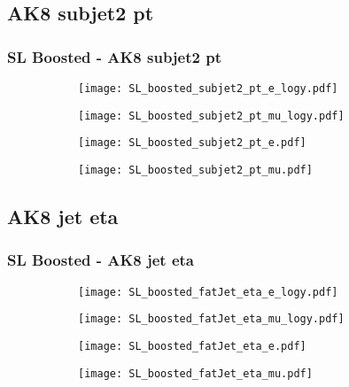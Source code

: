 \documentclass[aspectratio=169,8pt]{beamer}
\begin{document}
\subsection{AK8 subjet2 pt}
\begin{frame}
\frametitle{SL Boosted - AK8 subjet2 pt}
\begin{figure}
\captionsetup[subfigure]{labelformat=empty}
\begin{subfigure}{0.375\textwidth}
\texttt{[image: SL\_boosted\_subjet2\_pt\_e\_logy.pdf]}
\vspace*{-0.15cm}
\end{subfigure}
\hfil
\begin{subfigure}{0.375\textwidth}
\texttt{[image: SL\_boosted\_subjet2\_pt\_mu\_logy.pdf]}
\vspace*{-0.15cm}
\end{subfigure}
\hfil
\begin{subfigure}{0.375\textwidth}
\texttt{[image: SL\_boosted\_subjet2\_pt\_e.pdf]}
\vspace*{-0.15cm}
\end{subfigure}
\hfil
\begin{subfigure}{0.375\textwidth}
\texttt{[image: SL\_boosted\_subjet2\_pt\_mu.pdf]}
\vspace*{-0.15cm}
\end{subfigure}
\hfil
\end{figure}
\end{frame}
\newpage

\subsection{AK8 jet eta}
\begin{frame}
\frametitle{SL Boosted - AK8 jet eta}
\begin{figure}
\captionsetup[subfigure]{labelformat=empty}
\begin{subfigure}{0.375\textwidth}
\texttt{[image: SL\_boosted\_fatJet\_eta\_e\_logy.pdf]}
\vspace*{-0.15cm}
\end{subfigure}
\hfil
\begin{subfigure}{0.375\textwidth}
\texttt{[image: SL\_boosted\_fatJet\_eta\_mu\_logy.pdf]}
\vspace*{-0.15cm}
\end{subfigure}
\hfil
\begin{subfigure}{0.375\textwidth}
\texttt{[image: SL\_boosted\_fatJet\_eta\_e.pdf]}
\vspace*{-0.15cm}
\end{subfigure}
\hfil
\begin{subfigure}{0.375\textwidth}
\texttt{[image: SL\_boosted\_fatJet\_eta\_mu.pdf]}
\vspace*{-0.15cm}
\end{subfigure}
\hfil
\end{figure}
\end{frame}
\newpage
\end{document}
